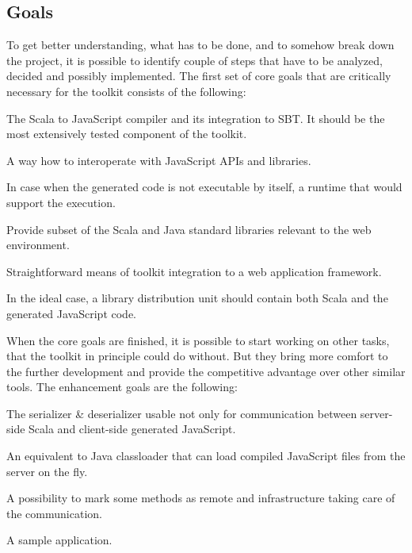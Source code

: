 \documentclass[12pt,a4paper]{report}
\begin{document}
\subsection{Goals}

To get better understanding, what has to be done, and to somehow break down the project, it is possible to identify couple of steps that have to be analyzed, decided and possibly implemented. The first set of core goals that are critically necessary for the toolkit consists of the following:

\begin{description}[style=multiline,leftmargin=5cm]
\item[1 - Compiler] The Scala to JavaScript compiler and its integration to SBT. It should be the most extensively tested component of the toolkit.
\item[2 - Interoperation] A way how to interoperate with JavaScript APIs and libraries.
\item[3 - Runtime] In case when the generated code is not executable by itself, a runtime that would support the execution.
\item[4 - Libraries] Provide subset of the Scala and Java standard libraries relevant to the web environment.
\item[5 - Integration] Straightforward means of toolkit integration to a web application framework.
\item[6 - Distribution] In the ideal case, a library distribution unit should contain both Scala and the generated JavaScript code.
\end{description}

When the core goals are finished, it is possible to start working on other tasks, that the toolkit in principle could do without. But they bring more comfort to the further development and provide the competitive advantage over other similar tools. The enhancement goals are the following:

\begin{description}[style=multiline,leftmargin=5cm]
\item[7 - Serialization] The serializer \& deserializer usable not only for communication between server-side Scala and client-side generated JavaScript.
\item[8 - Loading] An equivalent to Java classloader that can load compiled JavaScript files from the server on the fly.
\item[9 - RPC] A possibility to mark some methods as remote and infrastructure taking care of the communication.
\item[10 - Application] A sample application.
\end{description}
\end{document}
